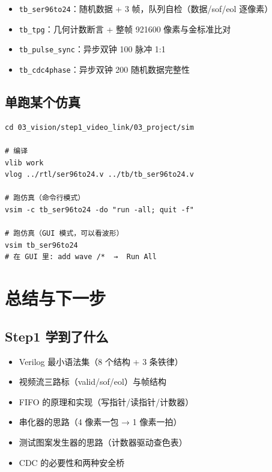 \documentclass[11pt]{ctexart}
\begin{document}
\begin{itemize}
  \item \texttt{tb\_ser96to24}：随机数据 + 3 帧，队列自检（数据/sof/eol 逐像素）
  \item \texttt{tb\_tpg}：几何计数断言 + 整帧 921600 像素与金标准比对
  \item \texttt{tb\_pulse\_sync}：异步双钟 100 脉冲 1:1
  \item \texttt{tb\_cdc4phase}：异步双钟 200 随机数据完整性
\end{itemize}

\subsection{单跑某个仿真}

\begin{Verbatim}[frame=single,fontsize=\small]
cd 03_vision/step1_video_link/03_project/sim

# 编译
vlib work
vlog ../rtl/ser96to24.v ../tb/tb_ser96to24.v

# 跑仿真（命令行模式）
vsim -c tb_ser96to24 -do "run -all; quit -f"

# 跑仿真（GUI 模式，可以看波形）
vsim tb_ser96to24
# 在 GUI 里: add wave /*  →  Run All
\end{Verbatim}



\section{总结与下一步}

\subsection{Step1 学到了什么}

\begin{itemize}
  \item Verilog 最小语法集（8 个结构 + 3 条铁律）
  \item 视频流三路标（valid/sof/eol）与帧结构
  \item FIFO 的原理和实现（写指针/读指针/计数器）
  \item 串化器的思路（4 像素一包 → 1 像素一拍）
  \item 测试图案发生器的思路（计数器驱动查色表）
  \item CDC 的必要性和两种安全桥
\end{itemize}
\end{document}
